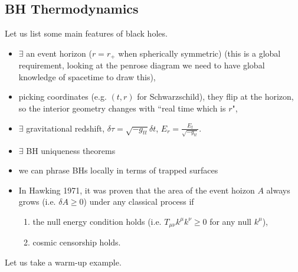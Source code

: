 \documentclass{article}
\begin{document}
\subsection{BH Thermodynamics}
Let us list some main features of black holes.
\begin{itemize}
	\item $\exists$ an event horizon ($r=r_+$ when spherically symmetric) (this is a global requirement, looking at the penrose diagram we need to have global knowledge of spacetime to draw this),
	\item picking coordinates (e.g. $(t,r)$ for Schwarzschild), they flip at the horizon, so the interior geometry changes with ``real time which is $r$", 
	\item $\exists$ gravitational redshift, $\delta \tau  = \sqrt{-g_{tt}} \delta t$, $E_r = \frac{E_t}{\sqrt{-g_{tt}}}$. 
	\item $\exists$ BH uniqueness theorems
	\item we can phrase BHs locally in terms of trapped surfaces
	\item In Hawking 1971, it was proven that the area of the event hoizon $A$ always grows (i.e. $\delta A \geq 0$) under any classical process if 
	\begin{enumerate}
		\item the null energy condition holds (i.e. $T_{\mu\nu}k^\mu k^\nu \geq 0$ for any null $k^\mu$),
		\item cosmic censorship holds.
	\end{enumerate}
\end{itemize}
Let us take a warm-up example. 
\end{document}
